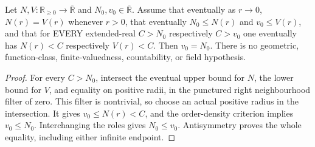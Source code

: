 \begin{lemma}
\label{lem:nf-general-order-squeeze}
\leanok
Let $N,V:\mathbb R_{\ge0}\to\overline{\mathbb R}$ and
$N_0,v_0\in\overline{\mathbb R}$. Assume that eventually as $r\to0$,
$N(r)=V(r)$ whenever $r>0$, that eventually $N_0\le N(r)$ and
$v_0\le V(r)$, and that for EVERY extended-real $C>N_0$
respectively $C>v_0$ one eventually has $N(r)<C$ respectively
$V(r)<C$. Then $v_0=N_0$. There is no geometric, function-class,
finite-valuedness, countability, or field hypothesis.
\end{lemma}
\begin{proof}
For every $C>N_0$, intersect the eventual upper bound for $N$, the
lower bound for $V$, and equality on positive radii, in the punctured
right neighbourhood filter of zero. This filter is nontrivial, so
choose an actual positive radius in the intersection. It gives
$v_0\le N(r)<C$, and the order-density criterion implies $v_0\le N_0$.
Interchanging the roles gives $N_0\le v_0$. Antisymmetry proves the
whole equality, including either infinite endpoint.
\end{proof}


